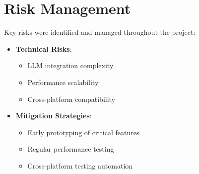 \section{Risk Management}
Key risks were identified and managed throughout the project:

\begin{itemize}
    \item \textbf{Technical Risks}:
    \begin{itemize}
        \item LLM integration complexity
        \item Performance scalability
        \item Cross-platform compatibility
    \end{itemize}
    
    \item \textbf{Mitigation Strategies}:
    \begin{itemize}
        \item Early prototyping of critical features
        \item Regular performance testing
        \item Cross-platform testing automation
    \end{itemize}
\end{itemize} 